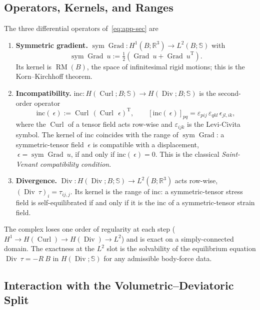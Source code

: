 \documentclass[12pt]{article}
\newcommand{\Reals}{\mathbb{R}}
\newcommand{\Syms}{\mathbb{S}}
\DeclareMathOperator{\Div}{Div}
\DeclareMathOperator{\Grad}{Grad}
\DeclareMathOperator{\Curl}{Curl}
\DeclareMathOperator{\sym}{sym}
\newcommand{\transpose}[1]{{#1}^{\mathrm{T}}}
\begin{document}
\subsection{Operators, Kernels, and Ranges}
\label{app:sec-ops}

The three differential operators of~\eqref{eq:app-sec} are
\begin{enumerate}
  \item \textbf{Symmetric gradient.}
    $\sym\Grad : H^1(B; \Reals^3) \to L^2(B; \Syms)$ with
    \begin{equation}
      \label{eq:app-symgrad}
      \sym\Grad ~u
      :=
      \tfrac{1}{2}\!\left(\Grad ~u + \transpose{\Grad ~u}\right).
    \end{equation}
    Its kernel is $\operatorname{RM}(B)$, the space of infinitesimal
    rigid motions; this is the Korn--Kirchhoff theorem.
  \item \textbf{Incompatibility.}
    $\mathrm{inc} : H(\Curl; B; \Syms) \to H(\Div; B; \Syms)$ is the
    second-order operator
    \begin{equation}
      \label{eq:app-inc}
      \mathrm{inc}(~\epsilon)
      :=
      \Curl\,\transpose{(\Curl\,~\epsilon)},
      \qquad
      \left[\mathrm{inc}(~\epsilon)\right]_{pq}
      =
      \varepsilon_{pij}\,\varepsilon_{qkl}\,\epsilon_{jl,ik},
    \end{equation}
    where the $\Curl$ of a tensor field acts row-wise and
    $\varepsilon_{ijk}$ is the Levi-Civita symbol. The kernel of
    $\mathrm{inc}$ coincides with the range of $\sym\Grad$: a
    symmetric-tensor field $~\epsilon$ is compatible with a
    displacement, $~\epsilon = \sym\Grad ~u$, if and only if
    $\mathrm{inc}(~\epsilon) = 0$. This is the classical
    \emph{Saint-Venant compatibility condition}.
  \item \textbf{Divergence.}
    $\Div : H(\Div; B; \Syms) \to L^2(B; \Reals^3)$ acts row-wise,
    $(\Div ~\tau)_i = \tau_{ij,j}$. Its kernel is the range of
    $\mathrm{inc}$: a symmetric-tensor stress field is self-equilibrated
    if and only if it is the $\mathrm{inc}$ of a symmetric-tensor
    strain field.
\end{enumerate}
The complex loses one order of regularity at each step
($H^1 \to H(\Curl) \to H(\Div) \to L^2$) and is exact on a
simply-connected domain. The exactness at the $L^2$ slot is the
solvability of the equilibrium equation $\Div~\tau = -R~B$ in
$H(\Div; \Syms)$ for any admissible body-force data.

\subsection{Interaction with the Volumetric--Deviatoric Split}
\label{app:sec-voldev}
\end{document}
